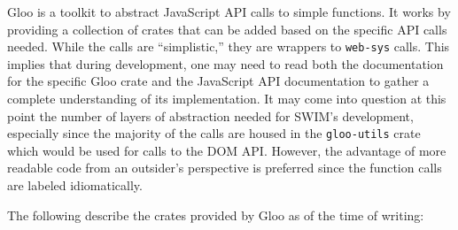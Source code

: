 \documentclass[
    paper=letter,
    parskip=half,
    fontsize=12pt,
    titlepage=firstiscover,
    toc=bibliography,
    numbers=endperiod
]{scrartcl}
\begin{document}
Gloo \cite{gloo} is a toolkit to abstract JavaScript API calls to simple
functions. It works by providing a collection of crates that can be
added based on the specific API calls needed. While the calls are
``simplistic,'' they are wrappers to \texttt{web-sys} calls. This
implies that during development, one may need to read both the
documentation for the specific Gloo crate and the JavaScript API
documentation to gather a complete understanding of its implementation.
It may come into question at this point the number of layers of
abstraction needed for SWIM's development, especially since the majority
of the calls are housed in the \texttt{gloo-utils} crate which would be
used for calls to the DOM API. However, the advantage of more readable
code from an outsider's perspective is preferred since the function
calls are labeled idiomatically.

The following describe the crates provided by Gloo as of the time of
writing:
\end{document}
